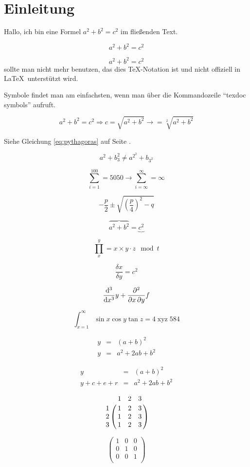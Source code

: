\documentclass[12pt,ngerman,parskip=full]{scrreprt}
\DeclareMathOperator{\xyz}{xyz}
\begin{document}
\chapter{Einleitung}

Hallo, ich bin eine Formel $a^2+b^2=c^2$  im fließenden Text. 

\[ a^2 + b^2 = c^2 \]

$$ a^2 + b^2 = c^2 $$ sollte man nicht mehr benutzen, das dies TeX-Notation ist und nicht offiziell in \LaTeX\ unterstützt wird. 

Symbole findet man am einfachsten, wenn man über die Kommandozeile \enquote{texdoc symbols} aufruft.

\begin{equation}\label{eq:pythagoras}
a^2 + b^2 = c^2 \Rightarrow c = \sqrt{a^2+b^2} \rightarrow  = \sqrt[2]{a^2+b^2}
\end{equation}

Siehe Gleichung  \ref{eq:pythagoras} auf Seite \pageref{eq:pythagoras}.

\[ a^2 + b_3^2  \not=  a^{2^2} + b_{3^2}  \]

\[  \sum_{i=1}^{100} = 5050  \rightarrow \sum_{i=\infty}^{\infty} = \infty \]

\[  -\frac{p}{2} \pm \sqrt{  \left(\frac{p}{4}\right)^2  - q  }   \]

\[  \overbrace{a^2 + b^2} = \underbrace{c^2}   \]

\[ \prod_{x}^{y} = x \times y \cdot z  \mod t \]


\[  \frac{\delta x}{\delta y} = c^2   \]

\[ \odv*[3]{y}{x} +  \pdv*{f}{x,y} \]

\[  \int_{x=1}^{\infty} \sin x \cos y \tan z = 4 \xyz 584 \]

\begin{eqnarray}
y &=& (a+b)^2 \\
y &=& a^2 + 2ab + b^2  
\end{eqnarray}

\[
\begin{array}{rcl}
y &=& (a+b)^2 \\
y + c+ e+ r &=& a^2 + 2ab + b^2  
\end{array}
\]

\[\bordermatrix{%
  & 1 & 2 & 3 \cr
1& 1 & 2 & 3 \cr
2& 1 & 2 & 3 \cr
3 & 1 & 2 & 3 \cr
}\]

\[\left(
\begin{array}{ccc} 
1 & 0 & 0 \\ 
0 & 1 & 0 \\ 
0 & 0 & 1 \\ 
\end{array}\right)
\]
\end{document}
